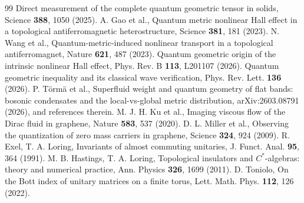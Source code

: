 \documentclass[11pt]{article}
\theoremstyle{definition}
\theoremstyle{plain}
\begin{document}
\begin{thebibliography}{99}
 Direct measurement of the complete quantum geometric tensor in solids, Science \textbf{388}, 1050 (2025).
 A. Gao et al., Quantum metric nonlinear Hall effect in a topological antiferromagnetic heterostructure, Science \textbf{381}, 181 (2023).
 N. Wang et al., Quantum-metric-induced nonlinear transport in a topological antiferromagnet, Nature \textbf{621}, 487 (2023).
 Quantum geometric origin of the intrinsic nonlinear Hall effect, Phys. Rev. B \textbf{113}, L201107 (2026).
 Quantum geometric inequality and its classical wave verification, Phys. Rev. Lett. \textbf{136} (2026).
 P. T\"orm\"a et al., Superfluid weight and quantum geometry of flat bands: bosonic condensates and the local-vs-global metric distribution, arXiv:2603.08791 (2026), and references therein.
 M. J. H. Ku et al., Imaging viscous flow of the Dirac fluid in graphene, Nature \textbf{583}, 537 (2020).
 D. L. Miller et al., Observing the quantization of zero mass carriers in graphene, Science \textbf{324}, 924 (2009).
 R. Exel, T. A. Loring, Invariants of almost commuting unitaries, J. Funct. Anal. \textbf{95}, 364 (1991).
 M. B. Hastings, T. A. Loring, Topological insulators and $C^*$-algebras: theory and numerical practice, Ann. Physics \textbf{326}, 1699 (2011).
 D. Toniolo, On the Bott index of unitary matrices on a finite torus, Lett. Math. Phys. \textbf{112}, 126 (2022).
\end{thebibliography}
\end{document}
